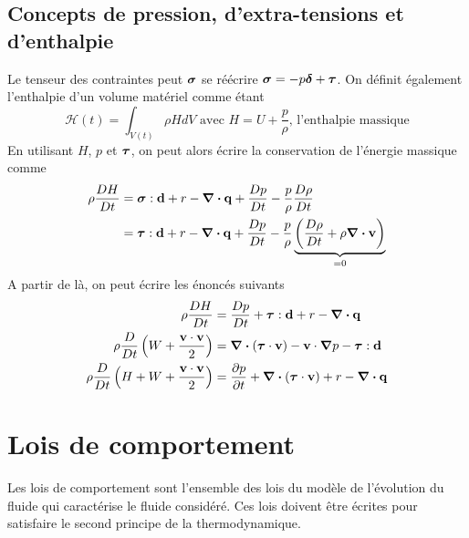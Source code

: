     \subsection{Concepts de pression, d'extra-tensions et d'enthalpie}
      Le tenseur des contraintes peut $\boldsymbol{\sigma}$ se réécrire $\boldsymbol{\sigma} = -p \boldsymbol{\delta} + \boldsymbol{\tau}$. On définit également l'enthalpie d'un volume matériel comme étant
      \begin{equation}
        \mathcal{H}(t) = \int_{V(t)} \rho H dV \textrm{ avec } H = U + \frac{p}{\rho}\textrm{, l'enthalpie massique}
      \end{equation}
      En utilisant $H$, $p$ et $\boldsymbol{\tau}$, on peut alors écrire la conservation de l'énergie massique comme
      \begin{align}
        \rho \frac{D H}{D t} &= \boldsymbol{\sigma} : \vb{d} + r - \div \vb{q} +  \frac{D p}{D t} - \frac{p}{\rho}\frac{D \rho}{D t}\nonumber\\
        &= \boldsymbol{\tau} : \vb{d} + r - \div \vb{q} + \frac{D p}{D t} - \frac{p}{\rho} \underbrace{\left(\frac{D \rho}{D t} + \rho \div \vb{v} \right)}_{=0}
      \end{align}
      A partir de là, on peut écrire les énoncés suivants
      \begin{equation}\begin{aligned}
        \rho \frac{D H}{D t} &= \frac{D p}{D t} + \boldsymbol{\tau} : \vb{d} + r - \div \vb{q}\\
        \rho \frac{D }{D t}\left(W + \frac{\vb{v}\cdot\vb{v}}{2}\right) &= \div (\boldsymbol{\tau} \cdot \vb{v}) - \vb{v} \cdot \grad p - \boldsymbol{\tau} : \vb{d} \\
        \rho \frac{D }{D t}\left(H + W + \frac{\vb{v}\cdot\vb{v}}{2}\right) &= \pdv{p}{t} + \div (\boldsymbol{\tau} \cdot \vb{v}) + r - \div \vb{q}
      \end{aligned}\end{equation}

  \section{Lois de comportement}
    Les lois de comportement sont l'ensemble des lois du modèle de l'évolution du fluide qui caractérise le fluide considéré. Ces lois doivent être écrites pour satisfaire le second principe de la thermodynamique.

